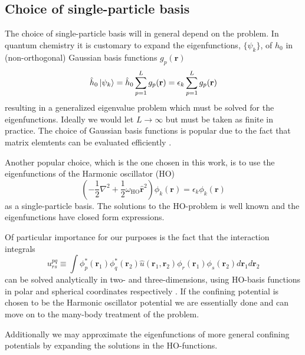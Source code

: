 \documentclass[aip,jcp,reprint,floatfix]{revtex4-1}
\begin{document}
\subsection{Choice of single-particle basis}
The choice of single-particle basis will in general depend on the
problem. In quantum chemistry it is customary to expand the
eigenfunctions, $\{ \psi_k \}$, of $\hat{h}_0$ in (non-orthogonal)
Gaussian basis functions $g_p(\mathbf{r})$
\begin{equation}
 \hat{h}_0 \ket{\psi_k} = \hat{h}_0 \sum_{p=1}^L g_p(\mathbf{r}) = \epsilon_k \sum_{p=1}^L g_p(\mathbf{r})
\end{equation}
resulting in a generalized eigenvalue problem which must be solved for
the eigenfunctions. Ideally we would let $L \rightarrow \infty$ but
must be taken as finite in practice.  The choice of Gaussian basis
functions is popular due to the fact that matrix elemtents can be
evaluated efficiently \cite{Helgaker00book}.

Another popular choice, which is the one chosen in this work, is to
use the eigenfunctions of the Harmonic oscillator (HO)
\begin{equation}
 \left(-\frac{1}{2}\nabla^2 + \frac{1}{2} \omega_{\text{HO}}\hat{\mathbf{r}}^2 \right) \phi_k(\mathbf{r}) = \epsilon_k \phi_k(\mathbf{r})  
\end{equation}
as a single-particle basis. The solutions to the HO-problem is well
known and the eigenfunctions have closed form expressions.

Of particular importance for our purposes is the fact that the
interaction integrals
\begin{equation}
 u^{pq}_{rs} \equiv \int \phi^*_p(\mathbf{r}_1) \phi^*_q(\mathbf{r}_2) \hat{u}(\mathbf{r}_1,\mathbf{r}_2) \phi_r(\mathbf{r}_1)\phi_s(\mathbf{r}_2) d\mathbf{r}_1 d\mathbf{r}_2
\end{equation}
can be solved analytically in two- and three-dimensions, using
HO-basis functions in polar and spherical coordinates respectively
\cite{Anisimovas98, Vorrath2003}. If the confining potential is chosen
to be the Harmonic oscillator potential we are essentially done and
can move on to the many-body treatment of the problem.

Additionally we may approximate the eigenfunctions of more general
confining potentials by expanding the solutions in the HO-functions.
\end{document}
